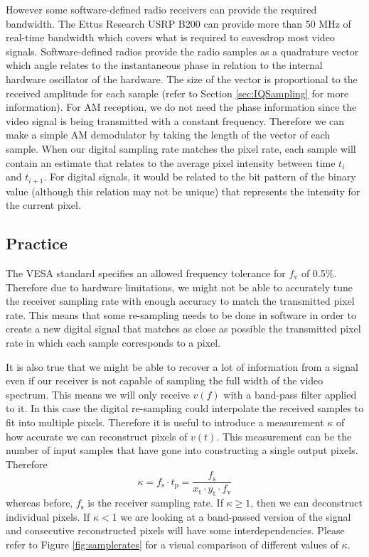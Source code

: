 \documentclass[a4paper,12pt,twoside,openright]{report}
\begin{document}
However some software-defined radio receivers can provide the required bandwidth. The Ettus Research USRP B200 can provide more than 50 MHz of real-time bandwidth which covers what is required to eavesdrop most video signals. Software-defined radios provide the radio samples as a quadrature vector which angle relates to the instantaneous phase in relation to the internal hardware oscillator of the hardware. The size of the vector is proportional to the received amplitude for each sample (refer to Section \ref{sec:IQSampling} for more information). For AM reception, we do not need the phase information since the video signal is being transmitted with a constant frequency. Therefore we can make a simple AM demodulator by taking the length of the vector of each sample. When our digital sampling rate matches the pixel rate, each sample will contain an estimate that relates to the average pixel intensity between time $t_{i}$ and $t_{i+1}$. For digital signals, it would be related to the bit pattern of the binary value (although this relation may not be unique) that represents the intensity for the current pixel.

\subsection{Practice}
The VESA standard specifies an allowed frequency tolerance for $f_\text{v}$ of 0.5\%. Therefore due to hardware limitations, we might not be able to accurately tune the receiver sampling rate with enough accuracy to match the transmitted pixel rate. This means that some re-sampling needs to be done in software in order to create a new digital signal that matches as close as possible the transmitted pixel rate in which each sample corresponds to a pixel.

It is also true that we might be able to recover a lot of information from a signal even if our receiver is not capable of sampling the full width of the video spectrum. This means we will only receive $v(f)$ with a band-pass filter applied to it. In this case the digital re-sampling could interpolate the received samples to fit into multiple pixels. Therefore it is useful to introduce a measurement $\kappa$ of how accurate we can reconstruct pixels of $v(t)$. This measurement can be the number of input samples that have gone into constructing a single output pixels. Therefore
\begin{equation}
\label{eq:kappa}
\kappa = f_\text{s} \cdot t_\text{p} = \frac{f_\text{s}}{x_\text{t} \cdot y_\text{t} \cdot f_\text{v}}
\end{equation}
whereas before, $f_\text{s}$ is the receiver sampling rate. If $\kappa \geq 1$, then we can deconstruct individual pixels. If $\kappa < 1$ we are looking at a band-passed version of the signal and consecutive reconstructed pixels will have some interdependencies. Please refer to Figure \ref{fig:samplerates} for a visual comparison of different values of $\kappa$.
\end{document}
